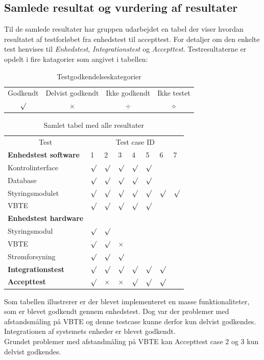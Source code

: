 \subsection{Samlede resultat og vurdering af resultater}
\label{ch:samlresultat}
Til de samlede resultater har gruppen udarbejdet en tabel der viser hvordan resultatet af testforløbet fra enhedstest til accepttest. For detaljer om den enkelte test henvises til \textit{Enhedstest}, \textit{Integrationstest} og \textit{Accepttest}. Testresultaterne er opdelt i fire katagorier som angivet i tabellen:
\begin{table}[H]
\centering
\begin{tabular}{cccc}
\hline
Godkendt 	& Delvist godkendt 	& Ikke godkendt & Ikke testet \\
\cmidrule(r){1-1} \cmidrule(r){2-2} \cmidrule(r){3-3} \cmidrule(r){4-4}
$\surd$		& $\times$		& $\div$ & $\diamond$	\\\hline
\end{tabular}
\caption{Testgodkendelseskategorier}
\end{table}
\begin{table}[H]
\centering
\begin{tabular}{llllllll}
\hline
\multicolumn{1}{c}{Test} & \multicolumn{7}{c}{Test case ID}\\
\cmidrule(r){1-1} \cmidrule(r){2-8} 
\textbf{Enhedstest software} & 1 & 2 & 3 & 4 & 5 & 6 & 7\\
\hline
\phantom{mm}Kontrolinterface& $\surd$ & $\surd$ & $\surd$ & $\surd$ & $\surd$ \\
\phantom{mm}Database  		& $\surd$ & $\surd$ & $\surd$ & $\surd$ & $\surd$ \\
\phantom{mm}Styringsmodulet	& $\surd$ & $\surd$ & $\surd$ & $\surd$ & $\surd$ &  $\surd$ & $\surd$\\
\phantom{mm}VBTE  			& $\surd$ & $\surd$ & $\surd$ & $\surd$ & $\surd$ \\ 
\textbf{Enhedstest hardware} \\
\hline
\phantom{mm}Styringsmodul	& $\surd$ & $\surd$\\
\phantom{mm}VBTE  			& $\surd$ & $\surd$ & $\times$ \\ 
\phantom{mm}Strømforsyning 	& $\surd$ & $\surd$ & $\surd$\\
\hline
\textbf{Integrationstest} 	& $\surd$ & $\surd$ & $\surd$ & $\surd$ & $\surd$ & $\surd$\\
\textbf{Accepttest} 		& $\surd$ & $\times$ & $\times$ & $\surd$ & $\surd$ & $\surd$\\
\hline
\end{tabular}
\caption{Samlet tabel med alle resultater}
\label{table:alle test samlet}
\end{table}
Som tabellen illustrerer er der blevet implementeret en masse funktionaliteter, som er blevet godkendt gennem enhedstest. Dog var der problemer med afstandsmåling på VBTE og denne testcase kunne derfor kun delvist godkendes.\\
Integrationen af systemets enheder er blevet godkendt.\\
Grundet problemer med afstandmåling på VBTE kan Accepttest case 2 og 3 kun delvist godkendes.\\
